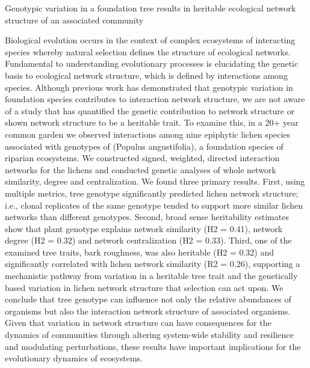 \documentclass{article}
\title{}
\author{Lau, Matthew K.}
\date{2020-10-12}
\begin{document}
Genotypic variation in a foundation tree results in heritable ecological network structure of an associated community

Biological evolution occurs in the context of complex ecosystems of interacting species whereby natural selection
defines the structure of ecological networks. Fundamental to understanding evolutionary processes is elucidating the
genetic basis to ecological network structure, which is defined by interactions among species. Although previous work
has demonstrated that genotypic variation in foundation species contributes to interaction network structure, we are
not aware of a study that has quantified the genetic contribution to network structure or shown network structure to be
a heritable trait. To examine this, in a %
%
20+ year common garden we observed interactions among nine epiphytic lichen species associated with genotypes of
(Populus angustifolia), a foundation species of riparian ecosystems. We constructed signed, weighted, directed
interaction networks for the lichens and conducted genetic analyses of whole network similarity, degree and
centralization. We found three primary results. First, using multiple metrics, tree genotype significantly predicted
lichen network structure; i.e., clonal replicates of the same genotype tended to support more similar lichen networks
than different genotypes. Second, broad sense heritability estimates show that plant genotype explains network
similarity (H2 = 0.41), network degree (H2 = 0.32) and network centralization (H2 = 0.33). Third, one of the examined
tree traits, bark roughness, was also heritable (H2 = 0.32) and significantly correlated with lichen network similarity
(R2 = 0.26), supporting a mechanistic pathway from variation in a heritable tree trait and the genetically based
variation in lichen network structure that selection can act upon. We conclude that tree genotype can influence not
only the relative abundances of organisms but also the interaction network structure of associated organisms. Given
that variation in network structure can have consequences for the dynamics of communities through altering system-wide
stability and resilience and modulating perturbations, these results have important implications for the evolutionary
dynamics of ecosystems. 
\end{document}
